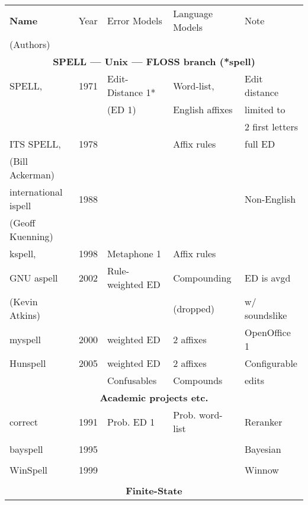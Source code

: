 \documentclass[officiallayout]{unihelcompling}
\begin{document}
\begin{table}
    \centering
    \begin{scriptsize}
    \begin{tabular}{|l|r|l|l|l|}
        \hline
        \bf Name & Year & Error Models & Language Models & Note \\
(Authors) & & & & \\
        \hline
        \multicolumn{5}{|c|}{\bf SPELL --- Unix --- FLOSS branch (*spell) }\\
        \hline
             SPELL, & 1971 & Edit-Distance 1* & Word-list, & Edit distance \\
        \citep{gorin1971spell} &  & (ED 1) & English affixes & limited to \\
                                  &  & &              & 2 first letters \\
        ITS SPELL, & 1978 &  & Affix rules & full ED \\
     (Bill Ackerman) & & & & \\
        international ispell & 1988 & & & Non-English \\
              (Geoff Kuenning) & & & & \\
        \hline
        kspell, & 1998 & Metaphone 1 & Affix rules & \\
        GNU aspell & 2002 & Rule-weighted ED & Compounding & ED is avgd \\
    (Kevin Atkins) & & & (dropped) & w/ soundslike \\
        \hline
        myspell & 2000 & weighted ED & 2 affixes & OpenOffice 1 \\
        \hline
        Hunspell & 2005 & weighted ED & 2 affixes & Configurable \\
                 &      & Confusables & Compounds & edits \\
        \hline
        \multicolumn{5}{|c|}{\bf Academic projects etc.} \\
        \hline
        correct & 1991 & Prob. ED 1 & Prob. word-list & Reranker \\
        \citep{church1991probability} & & & & \\
        \hline
        bayspell  & 1995 & & & Bayesian \\
        \citep{golding1995bayesian} \\
        \hline
        WinSpell & 1999 & & & Winnow \\
        \citep{golding1999winnow} & \\
        \hline
        \multicolumn{5}{|c|}{\bf Finite-State} \\

\end{tabular}
\end{scriptsize}
\end{table}
\end{document}
